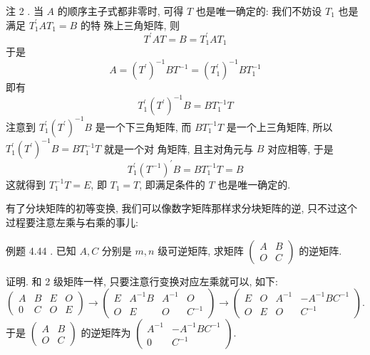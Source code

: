 \documentclass{article}
\begin{document}
{\heiti 注 2 .} 当 $A$ 的顺序主子式都非零时, 可得 $T$ 也是唯一确定的: 我们不妨设 $T_{1}$ 也是满足 $T_{1}^{\prime} A T_{1}=B$ 的特 殊上三角矩阵, 则
\begin{equation*}
    T^{\prime} A T=B=T_{1}^{\prime} A T_{1}
\end{equation*}
于是
\begin{equation*}
    A=\left(T^{\prime}\right)^{-1} B T^{-1}=\left(T_{1}^{\prime}\right)^{-1} B T_{1}^{-1}
\end{equation*}
即有
\begin{equation*}
    T_{1}^{\prime}\left(T^{\prime}\right)^{-1} B=B T_{1}^{-1} T
\end{equation*}
注意到 $T_{1}^{\prime}\left(T^{\prime}\right)^{-1} B$ 是一个下三角矩阵, 而 $B T_{1}^{-1} T$ 是一个上三角矩阵, 所以 $T_{1}^{\prime}\left(T^{\prime}\right)^{-1} B=B T_{1}^{-1} T$ 就是一个对
角矩阵, 且主对角元与 $B$ 对应相等, 于是
\begin{equation*}
    T_{1}^{\prime}\left(T^{-1}\right)^{\prime} B=B T_{1}^{-1} T=B
\end{equation*}
这就得到 $T_{1}^{-1} T=E$, 即 $T_{1}=T$, 即满足条件的 $T$ 也是唯一确定的.

有了分块矩阵的初等变换, 我们可以像数字矩阵那样求分块矩阵的逆, 只不过这个过程要注意左乘与右乘的事儿:

{\heiti 例题 4.44 .} {\kaishu 已知 $A, C$ 分别是 $m, n$ 级可逆矩阵, 求矩阵 $\left(\begin{array}{cc}A & B \\ O & C\end{array}\right)$ 的逆矩阵.}

\vspace{1ex}
{\heiti 证明.} 和 2 级矩阵一样, 只要注意行变换对应左乘就可以, 如下:
\begin{equation*}
    \left(\begin{array}{cccc}
        A & B & E & O \\
        0 & C & O & E
    \end{array}\right) \rightarrow\left(\begin{array}{cccc}
        E & A^{-1} B & A^{-1} & O      \\
        O & E        & O      & C^{-1}
    \end{array}\right) \rightarrow\left(\begin{array}{cccc}
        E & O & A^{-1} & -A^{-1} B C^{-1} \\
        O & E & O      & C^{-1}
    \end{array}\right).
\end{equation*}
于是 $\left(\begin{array}{ll}A & B \\ O & C\end{array}\right)$ 的逆矩阵为 $\left(\begin{array}{cc}A^{-1} & -A^{-1} B C^{-1} \\ 0 & C^{-1}\end{array}\right) .$
\end{document}
